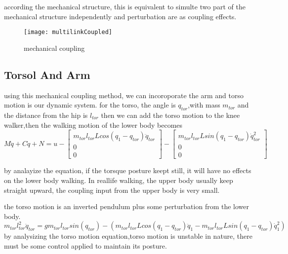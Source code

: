 according the mechanical structure, this is equivalent to simulte two part of the mechanical structure independently and perturbation are as coupling effects.
\begin{figure}[!htbp]
  \begin{center}
      \texttt{[image: multilinkCoupled]}
    \caption{mechanical coupling}
    \label{fig:mechcouple}
\end{center}
\end{figure}








\subsection*{Torsol And Arm}
using this mechanical coupling method, we can incoroporate the arm and torso motion is our dynamic system.
for the torso, the angle is $q_{tor}$,with mass $m_{tor}$ and the distance from the hip is $l_{tor}$
then we can add the torso motion to the knee walker,then the walking motion of the lower body becomes
\begin{equation}
\label{eq:walkcouplewithtorso}
M\ddot{q}+C\dot{q}+N=u-\left[\begin{array}{c}
m_{tor}l_{tor}Lcos(q_{1}-q_{tor})\ddot{q}_{tor}\\
0\\
0\end{array}\right]-\left[\begin{array}{c}
m_{tor}l_{tor}Lsin(q_{1}-q_{tor})\dot{q}_{tor}^{2}\\
0\\
0\end{array}\right]
\end{equation}

by analayize the equation, if the torsque posture keept still, it will have no effects on the lower body walking.
In reallife walking, the upper body usually keep straight upward, the coupling input from the upper body is very small.



the torso motion is an inverted pendulum plus some perturbation from the lower body.
\[
m_{tor}l_{tor}^{2}\ddot{q}_{tor}=gm_{tor}l_{tor}sin(q_{tor})-(m_{tor}l_{tor}Lcos(q_{1}-q_{tor})\ddot{q}_{1}-m_{tor}l_{tor}Lsin(q_{1}-q_{tor})\dot{q}_{1}^{2})
\]
by analysizing the torso motion equation,torso motion is unstable in nature, there must be some control applied to maintain its posture.

